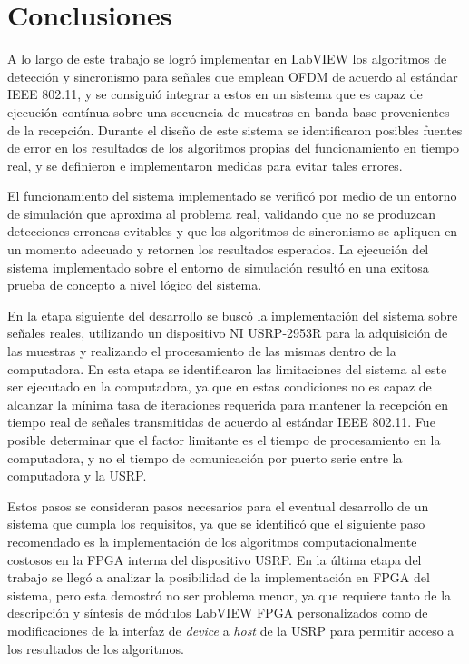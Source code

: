 \chapter{Conclusiones}
\label{Ch:6}
\graphicspath{{figs/}}

A lo largo de este trabajo se logró implementar en LabVIEW los algoritmos de detección y sincronismo para señales que emplean OFDM de acuerdo al estándar IEEE 802.11, y se consiguió integrar a estos en un sistema que es capaz de ejecución contínua sobre una secuencia de muestras en banda base provenientes de la recepción. Durante el diseño de este sistema se identificaron posibles fuentes de error en los resultados de los algoritmos propias del funcionamiento en tiempo real, y se definieron e implementaron medidas para evitar tales errores. 

El funcionamiento del sistema implementado se verificó por medio de un entorno de simulación que aproxima al problema real, validando que no se produzcan detecciones erroneas evitables y que los algoritmos de sincronismo se apliquen en un momento adecuado y retornen los resultados esperados. La ejecución del sistema implementado sobre el entorno de simulación resultó en una exitosa prueba de concepto a nivel lógico del sistema.

En la etapa siguiente del desarrollo se buscó la implementación del sistema sobre señales reales, utilizando un dispositivo NI USRP-2953R para la adquisición de las muestras y realizando el procesamiento de las mismas dentro de la computadora. En esta etapa se identificaron las limitaciones del sistema al este ser ejecutado en la computadora, ya que en estas condiciones no es capaz de alcanzar la mínima tasa de iteraciones requerida para mantener la recepción en tiempo real de señales transmitidas de acuerdo al estándar IEEE 802.11. Fue posible determinar que el factor limitante es el tiempo de procesamiento en la computadora, y no el tiempo de comunicación por puerto serie entre la computadora y la USRP.

Estos pasos se consideran pasos necesarios para el eventual desarrollo de un sistema que cumpla los requisitos, ya que se identificó que el siguiente paso recomendado es la implementación de los algoritmos computacionalmente costosos en la FPGA interna del dispositivo USRP. En la última etapa del trabajo se llegó a analizar la posibilidad de la implementación en FPGA del sistema, pero esta demostró no ser problema menor, ya que requiere tanto de la descripción y síntesis de módulos LabVIEW FPGA personalizados como de modificaciones de la interfaz de \textit{device} a \textit{host} de la USRP para permitir acceso a los resultados de los algoritmos.

